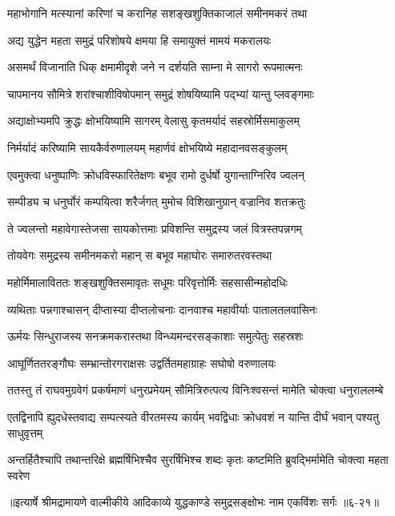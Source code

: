 \twolineshloka
{महाभोगानि मत्स्यानां करिणां च करानिह}
{सशङ्खशुक्तिकाजालं समीनमकरं तथा} %

\twolineshloka
{अद्य युद्धेन महता समुद्रं परिशोषये}
{क्षमया हि समायुक्तं मामयं मकरालयः} %

\twolineshloka
{असमर्थं विजानाति धिक् क्षमामीदृशे जने}
{न दर्शयति साम्ना मे सागरो रूपमात्मनः} %

\twolineshloka
{चापमानय सौमित्रे शरांश्चाशीविषोपमान्}
{समुद्रं शोषयिष्यामि पद्भ्यां यान्तु प्लवङ्गमाः} %

\twolineshloka
{अद्याक्षोभ्यमपि क्रुद्धः क्षोभयिष्यामि सागरम्}
{वेलासु कृतमर्यादं सहस्रोर्मिसमाकुलम्} %

\twolineshloka
{निर्मर्यादं करिष्यामि सायकैर्वरुणालयम्}
{महार्णवं क्षोभयिष्ये महादानवसङ्कुलम्} %

\twolineshloka
{एवमुक्त्वा धनुष्पाणिः क्रोधविस्फारितेक्षणः}
{बभूव रामो दुर्धर्षो युगान्ताग्निरिव ज्वलन्} %

\twolineshloka
{सम्पीड्य च धनुर्घोरं कम्पयित्वा शरैर्जगत्}
{मुमोच विशिखानुग्रान् वज्रानिव शतक्रतुः} %

\twolineshloka
{ते ज्वलन्तो महावेगास्तेजसा सायकोत्तमाः}
{प्रविशन्ति समुद्रस्य जलं वित्रस्तपन्नगम्} %

\twolineshloka
{तोयवेगः समुद्रस्य समीनमकरो महान्}
{स बभूव महाघोरः समारुतरवस्तथा} %

\twolineshloka
{महोर्मिमालाविततः शङ्खशुक्तिसमावृतः}
{सधूमः परिवृत्तोर्मिः सहसासीन्महोदधिः} %

\twolineshloka
{व्यथिताः पन्नगाश्चासन् दीप्तास्या दीप्तलोचनाः}
{दानवाश्च महावीर्याः पातालतलवासिनः} %

\twolineshloka
{ऊर्मयः सिन्धुराजस्य सनक्रमकरास्तथा}
{विन्ध्यमन्दरसङ्काशाः समुत्पेतुः सहस्रशः} %

\twolineshloka
{आघूर्णिततरङ्गौघः सम्भ्रान्तोरगराक्षसः}
{उद्वर्तितमहाग्राहः सघोषो वरुणालयः} %

\twolineshloka
{ततस्तु तं राघवमुग्रवेगं प्रकर्षमाणं धनुरप्रमेयम्}
{सौमित्रिरुत्पत्य विनिःश्वसन्तं मामेति चोक्त्वा धनुराललम्बे} %

\twolineshloka
{एतद्विनापि ह्युदधेस्तवाद्य सम्पत्स्यते वीरतमस्य कार्यम्}
{भवद्विधाः क्रोधवशं न यान्ति दीर्घं भवान् पश्यतु साधुवृत्तम्} %

\twolineshloka
{अन्तर्हितैश्चापि तथान्तरिक्षे ब्रह्मर्षिभिश्चैव सुरर्षिभिश्च}
{शब्दः कृतः कष्टमिति ब्रुवद्भिर्मामेति चोक्त्वा महता स्वरेण} %


॥इत्यार्षे श्रीमद्रामायणे वाल्मीकीये आदिकाव्ये युद्धकाण्डे समुद्रसङ्क्षोभः नाम एकविंशः सर्गः ॥६-२१॥
